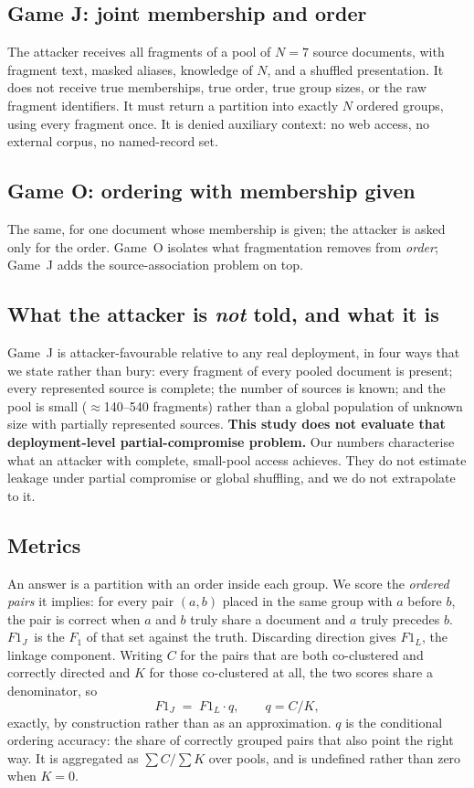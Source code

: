 \documentclass[sigconf,nonacm]{acmart}
\newcommand{\FJ}{\ensuremath{F1_J}}
\newcommand{\FL}{\ensuremath{F1_L}}
\begin{document}
\subsection{Game J: joint membership and order}
The attacker receives all fragments of a pool of $N=7$ source documents, with
fragment text, masked aliases, knowledge of $N$, and a shuffled presentation. It
does not receive true memberships, true order, true group sizes, or the raw
fragment identifiers. It must return a partition into exactly $N$ ordered groups,
using every fragment once. It is denied auxiliary context: no web access, no
external corpus, no named-record set.

\subsection{Game O: ordering with membership given}
The same, for one document whose membership is given; the attacker is asked only
for the order. Game~O isolates what fragmentation removes from \emph{order};
Game~J adds the source-association problem on top.

\subsection{What the attacker is \emph{not} told, and what it is}
Game~J is attacker-favourable relative to any real deployment, in four ways that
we state rather than bury: every fragment of every pooled document is present;
every represented source is complete; the number of sources is known; and the
pool is small ($\approx$140--540 fragments) rather than a global population of
unknown size with partially represented sources. \textbf{This study does not
evaluate that deployment-level partial-compromise problem.} Our numbers
characterise what an attacker with complete, small-pool access achieves. They do
not estimate leakage under partial compromise or global shuffling, and we do not
extrapolate to it.

\subsection{Metrics}
\label{sec:metrics}
An answer is a partition with an order inside each group. We score the
\emph{ordered pairs} it implies: for every pair $(a,b)$ placed in the same group
with $a$ before $b$, the pair is correct when $a$ and $b$ truly share a document
and $a$ truly precedes $b$. \FJ\ is the $F_1$ of that set against the truth.
Discarding direction gives \FL, the linkage component. Writing $C$ for the pairs
that are both co-clustered and correctly directed and $K$ for those co-clustered
at all, the two scores share a denominator, so
\[
  \FJ \;=\; \FL \cdot q, \qquad q = C/K,
\]
exactly, by construction rather than as an approximation. $q$ is the conditional
ordering accuracy: the share of correctly grouped pairs that also point the right
way. It is aggregated as $\sum C / \sum K$ over pools, and is undefined rather
than zero when $K=0$.
\end{document}

